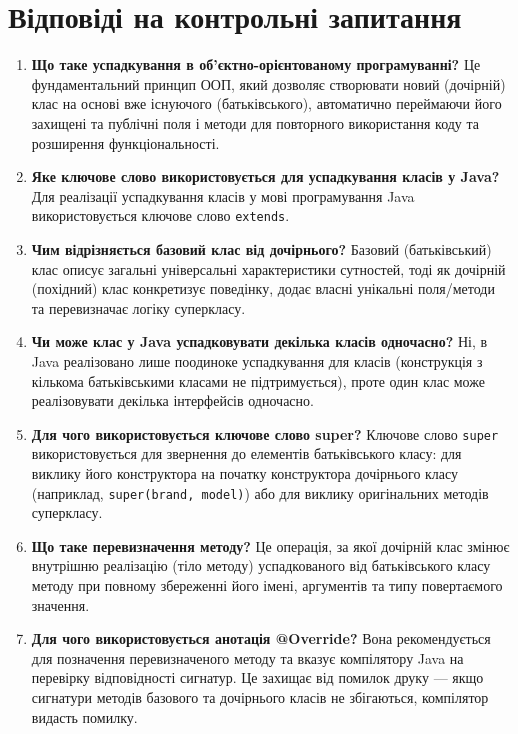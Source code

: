 \section{Відповіді на контрольні запитання}

\begin{enumerate}
    \item \textbf{Що таке успадкування в об'єктно-орієнтованому програмуванні?}
    Це фундаментальний принцип ООП, який дозволяє створювати новий (дочірній) клас 
    на основі вже існуючого (батьківського), автоматично переймаючи його захищені 
    та публічні поля і методи для повторного використання коду та розширення 
    функціональності.

    \item \textbf{Яке ключове слово використовується для успадкування класів у Java?}
    Для реалізації успадкування класів у мові програмування Java використовується 
    ключове слово \texttt{extends}.

    \item \textbf{Чим відрізняється базовий клас від дочірнього?}
    Базовий (батьківський) клас описує загальні універсальні характеристики сутностей, 
    тоді як дочірній (похідний) клас конкретизує поведінку, додає власні унікальні 
    поля/методи та перевизначає логіку суперкласу.

    \item \textbf{Чи може клас у Java успадковувати декілька класів одночасно?}
    Ні, в Java реалізовано лише поодиноке успадкування для класів (конструкція з 
    кількома батьківськими класами не підтримується), проте один клас може реалізовувати 
    декілька інтерфейсів одночасно.

    \item \textbf{Для чого використовується ключове слово super?}
    Ключове слово \texttt{super} використовується для звернення до елементів батьківського
     класу: для виклику його конструктора на початку конструктора дочірнього класу 
     (наприклад, \texttt{super(brand, model)}) або для виклику оригінальних методів 
     суперкласу.

    \item \textbf{Що таке перевизначення методу?}
    Це операція, за якої дочірній клас змінює внутрішню реалізацію (тіло методу) 
    успадкованого від батьківського класу методу при повному збереженні його імені, 
    аргументів та типу повертаємого значення.

    \item \textbf{Для чого використовується анотація @Override?}
    Вона рекомендується для позначення перевизначеного методу та вказує компілятору Java 
    на перевірку відповідності сигнатур. Це захищає від помилок друку — якщо сигнатури 
    методів базового та дочірнього класів не збігаються, компілятор видасть помилку.


\end{enumerate}
